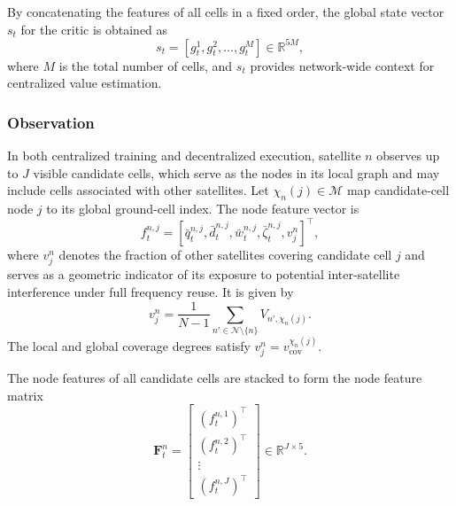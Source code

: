 \documentclass[journal]{IEEEtran}
\begin{document}
By concatenating the features of all cells in a fixed order, the global state vector $s_t$ for the critic is obtained as
\begin{equation}
s_t=[g_t^1,g_t^2,\ldots,g_t^M]\in\mathbb{R}^{5M},
\end{equation}
where $M$ is the total number of cells, and $s_t$ provides network-wide context for centralized value estimation.

\subsubsection{Observation}

In both centralized training and decentralized execution, satellite $n$ observes up to $J$ visible candidate cells, which serve as the nodes in its local graph and may include cells associated with other satellites. Let $\chi_n(j)\in\mathcal M$ map candidate-cell node $j$ to its global ground-cell index. The node feature vector is
\begin{equation}
f_t^{n,j}=[\bar q_t^{n,j},\bar d_t^{n,j},\bar w_t^{n,j},\bar\zeta_t^{n,j},v_j^n]^\top,
\end{equation}
where $v_j^n$ denotes the fraction of other satellites covering candidate cell $j$ and serves as a geometric indicator of its exposure to potential inter-satellite interference under full frequency reuse. It is given by
\begin{equation}
v_j^n=\frac{1}{N-1}\sum_{n'\in\mathcal N\setminus\{n\}}V_{n',\chi_n(j)}.
\label{eq:coverage-degree}
\end{equation}
The local and global coverage degrees satisfy $v_j^n=v_{\mathrm{cov}}^{\chi_n(j)}$.

The node features of all candidate cells are stacked to form the node feature matrix
\begin{equation}
\mathbf{F}_t^n=
\begin{bmatrix}
(f_t^{n,1})^\top\\
(f_t^{n,2})^\top\\
\vdots\\
(f_t^{n,J})^\top
\end{bmatrix}
\in\mathbb{R}^{J\times 5}.
\end{equation}
\end{document}
